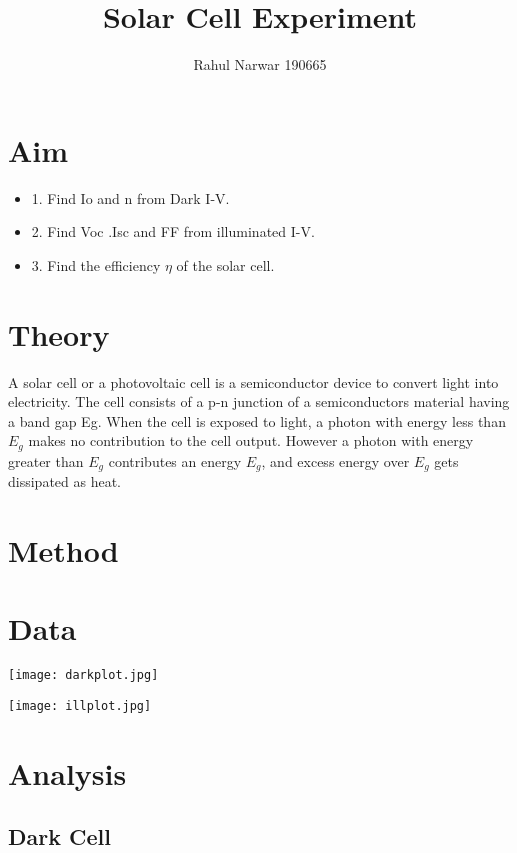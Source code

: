 \documentclass{article}
\title{Solar Cell Experiment}
\author{Rahul Narwar 190665 }
\begin{document}
\maketitle

\section{Aim}

\begin{itemize}
    \item 1. Find Io and n from Dark I-V.
    \item 2. Find Voc .Isc and FF from illuminated I-V.
    \item 3. Find the efficiency $\eta$ of the solar cell.
\end{itemize}

\section{Theory}

A solar cell or a photovoltaic cell is a semiconductor device to convert light into electricity. The
cell consists of a p-n junction of a semiconductors material having a band gap Eg. When the cell
is exposed to light, a photon with energy less than $E_g$ makes no contribution to the cell
output. However a photon with energy greater than $E_g$ contributes an energy $E_g$, and excess energy over $E_g$ gets dissipated as heat.

\section{Method}

\section{Data}

\texttt{[image: darkplot.jpg]}

\texttt{[image: illplot.jpg]}

\section{Analysis}

\subsection{Dark Cell}
\end{document}

